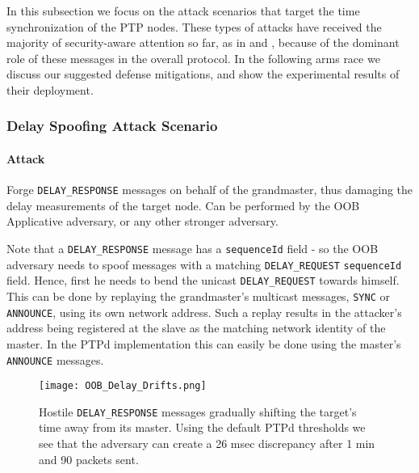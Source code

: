 \documentclass[11pt]{article}
\begin{document}
In this subsection we focus on the attack scenarios that target the time synchronization of the PTP nodes. These types of attacks have received the majority of security-aware attention so far, as in \cite{Threat_Analysis} and \cite{Delay}, because of the dominant role of these messages in the overall protocol. In the following arms race we discuss our suggested defense mitigations, and show the experimental results of their deployment.



\subsubsection{Delay Spoofing Attack Scenario}\label{time:scenrio1}

\paragraph{Attack}

Forge \texttt{DELAY_RESPONSE} messages on behalf of the grandmaster, thus damaging the delay measurements of the target node. Can be performed by the OOB Applicative adversary, or any other stronger adversary.



Note that a \texttt{DELAY_RESPONSE} message has a \texttt{sequenceId} field - so the OOB adversary needs to spoof messages with a matching \texttt{DELAY_REQUEST} \texttt{sequenceId} field. Hence, first he needs to bend the unicast \texttt{DELAY_REQUEST} towards himself. This can be done by replaying the grandmaster's multicast messages, \texttt{SYNC} or \texttt{ANNOUNCE}, using its own network address. Such a replay results in the attacker's address being registered at the slave as the matching network identity of the master. In the PTPd implementation this can easily be done using the master's \texttt{ANNOUNCE} messages.



\begin{figure}[t]

\centerline{\texttt{[image: OOB\_Delay\_Drifts.png]}}

\caption{Hostile \texttt{DELAY_RESPONSE} messages gradually shifting the target's time away from its master. Using the default PTPd thresholds we see that the adversary can create a 26 msec discrepancy after 1 min and 90 packets sent.}

\label{Delay Spoofing}

\end{figure}
\end{document}
